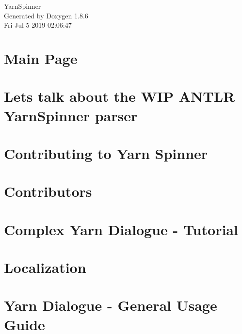 \documentclass[twoside]{book}
\newcommand{\clearemptydoublepage}{%
  \newpage{\pagestyle{empty}\cleardoublepage}%
}
\begin{document}
\hypersetup{pageanchor=false}
\begin{titlepage}
\vspace*{7cm}
\begin{center}%
{\Large Yarn\-Spinner }\\
\vspace*{1cm}
{\large Generated by Doxygen 1.8.6}\\
\vspace*{0.5cm}
{\small Fri Jul 5 2019 02:06:47}\\
\end{center}
\end{titlepage}
\clearemptydoublepage
\tableofcontents
\clearemptydoublepage
{}
\hypersetup{pageanchor=true}

\chapter{Main Page}
\label{index}\hypertarget{index}{}
\chapter{Lets talk about the W\-I\-P A\-N\-T\-L\-R Yarn\-Spinner parser}
\label{a00002}
\hypertarget{a00002}{}

\chapter{Contributing to Yarn Spinner}
\label{a00004}
\hypertarget{a00004}{}

\chapter{Contributors}
\label{a00006}
\hypertarget{a00006}{}

\chapter{Complex Yarn Dialogue -\/ Tutorial}
\label{a00008}
\hypertarget{a00008}{}

\chapter{Localization}
\label{a00010}
\hypertarget{a00010}{}

\chapter{Yarn Dialogue -\/ General Usage Guide}
\label{a00012}
\hypertarget{a00012}{}

\end{document}
